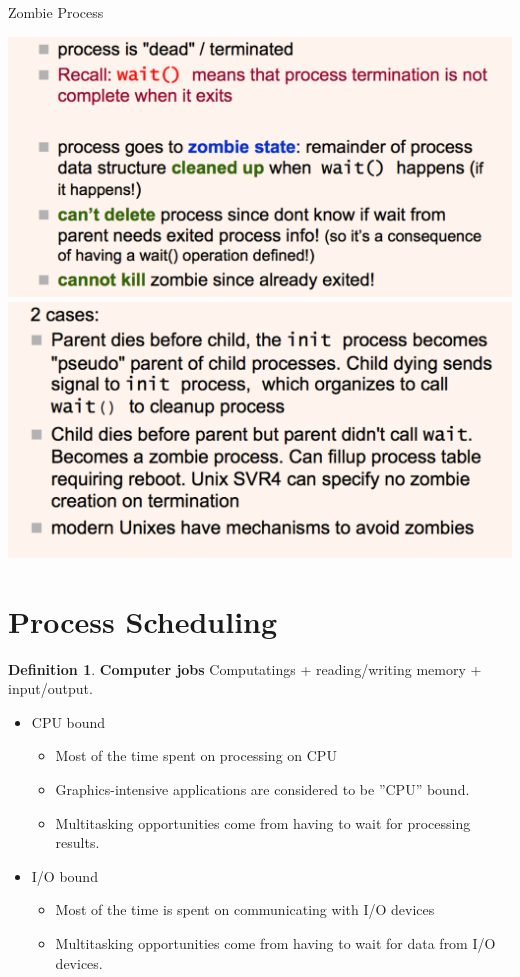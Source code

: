 \documentclass[11pt,a4paper]{article}
\theoremstyle{definition}
\newtheorem{definition}{Definition}[section]
\newenvironment{myitemize}
{ \begin{itemize}
    \setlength{\itemsep}{5pt}
    \setlength{\parskip}{0pt}
    \setlength{\parsep}{0pt}     }
{ \end{itemize}                  }
\begin{document}
\begin{tcolorbox}
	\textsf{Zombie Process}
	
	\includegraphics[scale=0.27]{m1/zombieProcess1}
	\includegraphics[scale=0.27]{m1/zombieProcess2}
	\centering
\end{tcolorbox}

\section{Process Scheduling}

\begin{definition}{\textbf{Computer jobs}}
	Computatings + reading/writing memory + input/output.
	\begin{myitemize}
		\item CPU bound
		\begin{myitemize}
			\item Most of the time spent on processing on CPU
			\item Graphics-intensive applications are considered to be ''CPU'' bound.
			\item Multitasking opportunities come from having to wait for processing results.
		\end{myitemize}
		\item I/O bound
		\begin{myitemize}
			\item Most of the time is spent on communicating with I/O devices
			\item Multitasking opportunities come from having to wait for data from I/O devices.
		\end{myitemize}
	\end{myitemize}
\end{definition}
\end{document}
